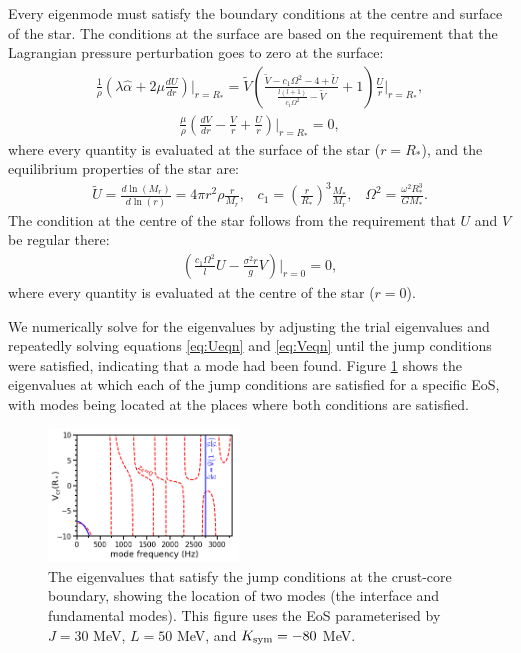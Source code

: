 \documentclass[fleqn,usenatbib]{mnras}
\begin{document}
\hspace{\parindent}Every eigenmode must satisfy the boundary conditions at the centre and surface of the star. The conditions at the surface are based on the requirement that the Lagrangian pressure perturbation goes to zero at the surface:
\begin{align}
\frac{1}{\rho}\left(\lambda\hat{\alpha}+2\mu\frac{dU}{dr}\right)\biggr\rvert_{r=R_{*}}=\tilde{V}\left(\frac{\tilde{V}-c_1\Omega^2-4+\tilde{U}}{\frac{l(l+1)}{c_1\Omega^2}-\tilde{V}}+1\right)\frac{U}{r}\biggr\rvert_{r=R_{*}},
\label{eq:surface_boundary_modified_1}
\end{align}
\begin{align}
\frac{\mu}{\rho}\left(\frac{dV}{dr}-\frac{V}{r}+\frac{U}{r}\right)\biggr\rvert_{r=R_{*}}=0,
\label{eq:surface_boundary_modified_2}
\end{align}
\noindent where every quantity is evaluated at the surface of the star ($r=R_*$), and the equilibrium properties of the star are: 
\begin{align}\nonumber
\tilde{U}=\frac{d\ln\left(M_r\right)}{d\ln\left(r\right)}=4\pi r^2\rho\frac{r}{M_r},\;\;\;c_1=\left(\frac{r}{R_*}\right)^3\frac{M_*}{M_r},\;\;\;\Omega^2=\frac{\omega^2R_*^3}{GM_*}.
\end{align}
\noindent The condition at the centre of the star follows from the requirement that $U$ and $V$ be regular there:
\begin{align}
\left(\frac{c_1\Omega^2}{l}U-\frac{\sigma^2r}{g}V\right)\biggr\rvert_{r=0}=0,
\label{eq:core_condition}
\end{align}
\noindent where every quantity is evaluated at the centre of the star ($r=0$).


\hspace{\parindent}We numerically solve for the eigenvalues by adjusting the trial eigenvalues and repeatedly solving equations \ref{eq:Ueqn} and \ref{eq:Veqn} until the jump conditions were satisfied, indicating that a mode had been found. Figure \ref{fig:trace_minima} shows the eigenvalues at which each of the jump conditions are satisfied for a specific EoS, with modes being located at the places where both conditions are satisfied.

\begin{figure}
\centering
\includegraphics[width=0.45\textwidth,angle=0]{minima_30_50_-80.png}
\caption{The eigenvalues that satisfy the jump conditions at the crust-core boundary, showing the location of two modes (the interface and fundamental modes). This figure uses the EoS parameterised by $J=30$ MeV, $L=50$ MeV, and $K_{\rm sym}=-80$ MeV.}
\label{fig:trace_minima}
\end{figure}
\end{document}
